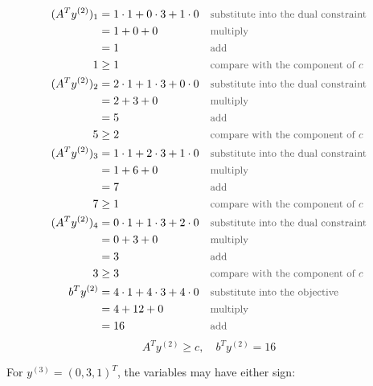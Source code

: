 \documentclass[a4paper,11pt]{article}
\newif\ifexplain
\newcommand{\why}[1]{\text{\small\color{black!65}#1}}
\newcommand{\explain}[1]{\ifexplain\begin{erklbox}#1\end{erklbox}\fi}
\begin{document}
\begin{align*}
(A^Ty^{(2)})_{1} &= 1\cdot 1 + 0\cdot 3 + 1\cdot 0 && \why{substitute into the dual constraint}\\
&= 1 + 0 + 0 && \why{multiply}\\
&= 1 && \why{add}\\
1 &\ge 1 && \why{compare with the component of $c$}\\
(A^Ty^{(2)})_{2} &= 2\cdot 1 + 1\cdot 3 + 0\cdot 0 && \why{substitute into the dual constraint}\\
&= 2 + 3 + 0 && \why{multiply}\\
&= 5 && \why{add}\\
5 &\ge 2 && \why{compare with the component of $c$}\\
(A^Ty^{(2)})_{3} &= 1\cdot 1 + 2\cdot 3 + 1\cdot 0 && \why{substitute into the dual constraint}\\
&= 1 + 6 + 0 && \why{multiply}\\
&= 7 && \why{add}\\
7 &\ge 1 && \why{compare with the component of $c$}\\
(A^Ty^{(2)})_{4} &= 0\cdot 1 + 1\cdot 3 + 2\cdot 0 && \why{substitute into the dual constraint}\\
&= 0 + 3 + 0 && \why{multiply}\\
&= 3 && \why{add}\\
3 &\ge 3 && \why{compare with the component of $c$}\\
b^Ty^{(2)} &= 4\cdot 1 + 4\cdot 3 + 4\cdot 0 && \why{substitute into the objective}\\
&= 4 + 12 + 0 && \why{multiply}\\
&= 16 && \why{add}
\end{align*}
\[\boxed{A^Ty^{(2)}\ge c,\quad b^Ty^{(2)}=16}\]
\explain{Beim dualen Punkt prüfen wir jede Ungleichung. Die linke Seite darf größer als die entsprechende Komponente von $c$ sein; Gleichheit ist nicht verlangt.}
For $y^{(3)}=(0,3,1)^T$, the variables may have either sign:
\end{document}
